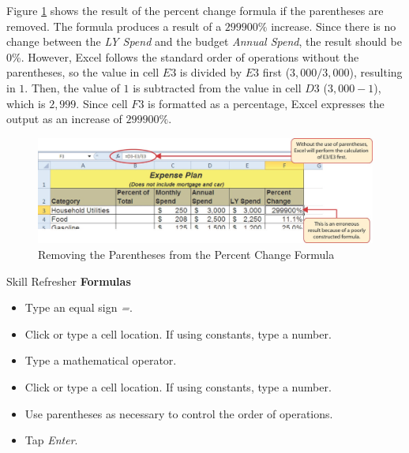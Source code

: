 Figure \ref{02:fig07} shows the result of the percent change formula if the parentheses are removed. The formula produces a result of a $ 299900\% $ increase. Since there is no change between the \textit{LY Spend} and the budget \textit{Annual Spend}, the result should be 0\%. However, Excel follows the standard order of operations without the parentheses, so the value in cell $ E3 $ is divided by $ E3 $ first ($ 3,000 / 3,000 $), resulting in $ 1 $. Then, the value of $ 1 $ is subtracted from the value in cell $ D3 $ ($ 3,000 - 1 $), which is $ 2,999 $. Since cell $ F3 $ is formatted as a percentage, Excel expresses the output as an increase of $ 299900\% $.

\begin{figure}[H]
	\centering
	\includegraphics[width=\maxwidth{.95\linewidth}]{gfx/ch02_fig07}
	\caption{Removing the Parentheses from the Percent Change Formula}
	\label{02:fig07}
\end{figure}

\begin{center}
	\begin{sklbox}{Skill Refresher}
		\textbf{Formulas}
		\\
		\begin{itemize}
			\setlength{\itemsep}{0pt}
			\setlength{\parskip}{0pt}
			\setlength{\parsep}{0pt}
			
			\item Type an equal sign \textit{=}.
			\item Click or type a cell location. If using constants, type a number.
			\item Type a mathematical operator.
			\item Click or type a cell location. If using constants, type a number.
			\item Use parentheses as necessary to control the order of operations.
			\item Tap \textit{Enter}.

		\end{itemize}
	\end{sklbox}
\end{center}

